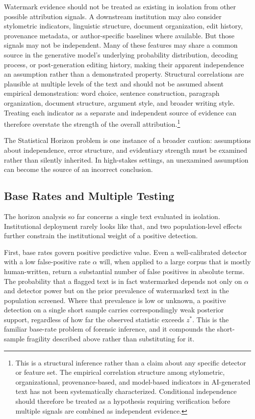\documentclass[11pt]{article}
\begin{document}
Watermark evidence should not be treated as existing in isolation from other
possible attribution signals. A downstream institution may also consider stylometric
indicators, linguistic structure, document organization, edit history, provenance
metadata, or author-specific baselines where available. But those signals may not be
independent. Many of these features may share a common source in the generative
model's underlying probability distribution, decoding process, or post-generation
editing history, making their apparent independence an assumption rather than a
demonstrated property. Structural correlations are plausible at multiple levels of
the text and should not be assumed absent empirical demonstration: word choice,
sentence construction, paragraph organization, document structure, argument style,
and broader writing style. Treating each indicator as a separate and independent
source of evidence can therefore overstate the strength of the overall
attribution.\footnote{This is a structural inference rather than a claim about any
specific detector or feature set. The empirical correlation structure among
stylometric, organizational, provenance-based, and model-based indicators in
AI-generated text has not been systematically characterized. Conditional
independence should therefore be treated as a hypothesis requiring verification
before multiple signals are combined as independent evidence.}

The Statistical Horizon problem is one instance of a broader caution: assumptions
about independence, error structure, and evidentiary strength must be examined
rather than silently inherited. In high-stakes settings, an unexamined assumption
can become the source of an incorrect conclusion.

\subsection{Base Rates and Multiple Testing}

The horizon analysis so far concerns a single text evaluated in isolation.
Institutional deployment rarely looks like that, and two population-level effects
further constrain the institutional weight of a positive detection.

First, base rates govern positive predictive value. Even a well-calibrated detector
with a low false-positive rate $\alpha$ will, when applied to a large corpus that is
mostly human-written, return a substantial number of false positives in absolute
terms. The probability that a flagged text is in fact watermarked depends not only on
$\alpha$ and detector power but on the prior prevalence of watermarked text in the
population screened. Where that prevalence is low or unknown, a positive detection on
a single short sample carries correspondingly weak posterior support, regardless of
how far the observed statistic exceeds $z^*$. This is the familiar base-rate problem
of forensic inference, and it compounds the short-sample fragility described above
rather than substituting for it.
\end{document}
